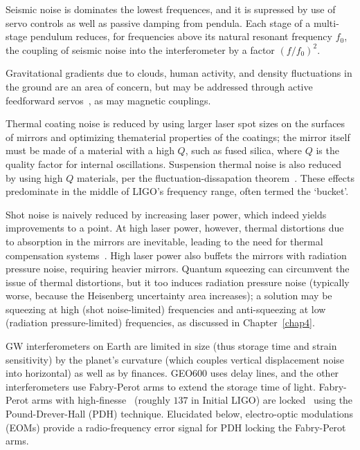 Seismic noise is dominates the lowest frequences, and it is supressed by use of servo controls as well as passive damping from pendula.
Each stage of a multi-stage pendulum reduces, for frequencies above its natural resonant frequency $f_0$, the coupling of seismic noise into the interferometer by a factor $(f/f_0)^2$.

Gravitational gradients due to clouds, human activity, and density fluctuations in the ground are an area of concern, but may be addressed through active feedforward servos~\cite{Driggers2012ActiveNoise}, as may magnetic couplings.

Thermal coating noise is reduced by using larger laser spot sizes on the surfaces of mirrors and optimizing thematerial properties of the coatings; the mirror itself must be made of a material with a high $Q$, such as fused silica, where $Q$ is the quality factor for internal oscillations.
Suspension thermal noise is also reduced by using high $Q$ materials, per the fluctuation-dissapation theorem~\cite{Saulson}.
These effects predominate in the middle of LIGO's frequency range, often termed the `bucket'.

Shot noise is naively reduced by increasing laser power, which indeed yields improvements to a point.
At high laser power, however, thermal distortions due to absorption in the mirrors are inevitable, leading to the need for thermal compensation systems~\cite{BallmerThesis}.
High laser power also buffets the mirrors with radiation pressure noise, requiring heavier mirrors.
Quantum squeezing can circumvent the issue of thermal distortions, but it too induces radiation pressure noise (typically worse, because the Heisenberg uncertainty area increases); a solution may be squeezing at high (shot noise-limited) frequencies and anti-squeezing at low (radiation pressure-limited) frequencies, as discussed in Chapter~\ref{chap4}.


GW interferometers on Earth are limited in size (thus storage time and strain sensitivity) by the planet's curvature (which couples vertical displacement noise into horizontal) as well as by finances. 
GEO600 uses delay lines, and the other interferometers use Fabry-Perot arms to extend the storage time of light.
Fabry-Perot arms with high-finesse~\cite{ResonanceFP,ResponsesFP} (roughly $137$ in Initial LIGO) are locked~\cite{PDHNotes} using the Pound-Drever-Hall (PDH) technique.
Elucidated below, electro-optic modulations (EOMs) provide a radio-frequency error signal for PDH locking the Fabry-Perot arms.


